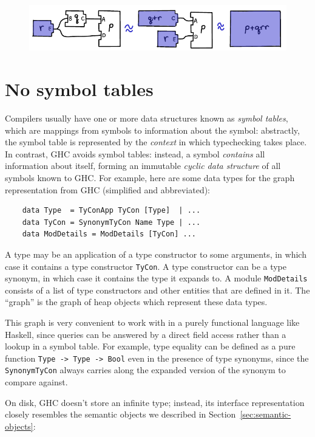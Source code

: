 \begin{figure}[H]
\center\includegraphics{figures/unit-identifier-improvement.pdf}
\end{figure}

\section{No symbol tables}

Compilers usually have one or more data structures known as
\emph{symbol tables}, which are mappings from symbols to information
about the symbol: abstractly, the symbol table is represented by
the \emph{context} in which typechecking takes place.
In contrast, GHC avoids symbol tables:  instead, a
symbol \emph{contains} all information about itself, forming an
immutable \emph{cyclic data structure} of all symbols
known to GHC\@.  For example, here are
some data types for the graph representation from GHC (simplified
and abbreviated):

\begin{lstlisting}
    data Type  = TyConApp TyCon [Type]  | ...
    data TyCon = SynonymTyCon Name Type | ...
    data ModDetails = ModDetails [TyCon] ...
\end{lstlisting}
%
A type may be an application of a type constructor to some arguments, in which
case it contains a type constructor \verb|TyCon|.  A type constructor
can be a type synonym, in which case it contains the type it expands
to.  A module \verb|ModDetails| consists of a list of type constructors
and other entities that are defined in it.  The ``graph'' is the graph of
heap objects which represent these data types.

This graph is very convenient to work with in a purely functional
language like Haskell, since queries can be answered by a direct field
access rather than a lookup in a symbol table.  For example, type
equality can be defined as a pure function \verb|Type -> Type -> Bool|
even in the presence of type synonyms, since the \verb|SynonymTyCon|
always carries along the expanded version of the synonym to compare
against.

On disk, GHC doesn't store an infinite type; instead, its
interface representation closely resembles the semantic objects
we described in Section~\ref{sec:semantic-objects}:

